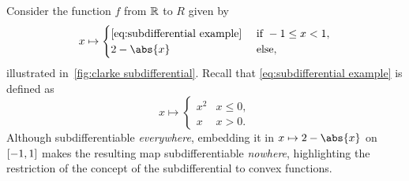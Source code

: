 Consider the function \( f \) from \( \mathbb{R} \) to \( R \) given by
\begin{equation}
	x \mapsto \begin{cases}
		\text{\cref{eq:subdifferential example}} &\ \text{if}\ \num{-1} \leq x < \num{1}, \\
		\num{2} - \abs{x} &\ \text{else},
	\end{cases}
\end{equation}
illustrated in~\cref{fig:clarke subdifferential}.
Recall that \cref{eq:subdifferential example} is defined as
\begin{equation}
	x \mapsto \begin{cases}
		x^{\num{2}} & x \leq \num{0}, \\
		x   & x > \num{0}.
	\end{cases}
\end{equation}
Although subdifferentiable \emph{everywhere}, embedding it in \( x \mapsto \num{2} - \abs{x} \) on \( \interval{\num{-1}}{\num{1}} \) makes the resulting map subdifferentiable \emph{nowhere}, highlighting the restriction of the concept of the subdifferential to convex functions.
\begin{sidefigure}
	\caption[The Clarke subdifferential]{%
		The Clarke subdifferential provides a generalization of the gradient to nondifferentiable functions.
		The dashed region is shown in~\cref{fig:subdifferential}, the gray shaded areas show the span of linear functions constructed from the Clarke subdifferential at \num{0} and \num{1}.
	}%
	\label{fig:clarke subdifferential}
\end{sidefigure}

